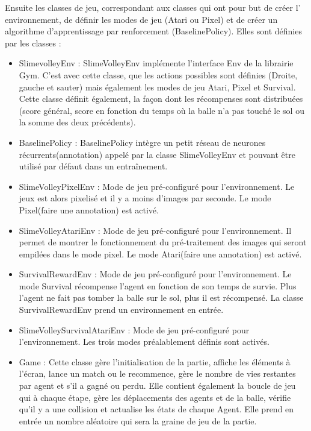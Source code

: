 \documentclass[11pt, a4paper]{article}
\begin{document}
Ensuite les classes de jeu, correspondant aux classes qui ont pour but de créer l' environnement, de définir les modes de jeu (Atari ou Pixel) et de créer un algorithme d'apprentissage par renforcement (BaselinePolicy). Elles sont définies par les classes : \\
\begin{itemize}
 \item SlimevolleyEnv : SlimeVolleyEnv implémente l'interface Env de la librairie Gym. C'est avec cette classe, que les actions possibles sont définies (Droite, gauche et sauter) mais également les modes de jeu Atari, Pixel et Survival. Cette classe définit également, la façon dont les récompenses sont distribuées (score général, score en fonction du temps où la balle n'a pas touché le sol ou la somme des deux précédents).\\

 \item BaselinePolicy : BaselinePolicy intègre un petit réseau de neurones récurrents(annotation) appelé par la classe SlimeVolleyEnv et pouvant être utilisé par défaut dans un entraînement.\\

 \item SlimeVolleyPixelEnv : Mode de jeu pré-configuré pour l'environnement. Le jeux est alors pixelisé et il y a moins d'images par seconde. Le mode Pixel(faire une annotation) est activé. \\
 
 \item SlimeVolleyAtariEnv : Mode de jeu pré-configuré pour l'environnement. Il permet de montrer le fonctionnement du pré-traitement des images qui seront empilées dans le mode pixel. Le mode Atari(faire une annotation) est activé. \\ 

\item SurvivalRewardEnv : Mode de jeu pré-configuré pour l'environnement. Le mode Survival récompense l'agent en fonction de son temps de survie. Plus l'agent ne fait pas tomber la balle sur le sol, plus il est récompensé. La classe SurvivalRewardEnv prend un environnement en entrée.
 \item  SlimeVolleySurvivalAtariEnv : Mode de jeu pré-configuré pour l'environnement. Les trois modes préalablement définis sont activés. \\

 \item Game : Cette classe gère l'initialisation de la partie, affiche les éléments à l'écran, lance un match ou le recommence, gère le nombre de vies restantes par agent et s'il a gagné ou perdu. Elle contient également la boucle de jeu qui à chaque étape, gère les déplacements des agents et de la balle, vérifie qu'il y a une collision et actualise les états de chaque Agent. Elle prend en entrée un nombre aléatoire qui sera la graine de jeu de la partie. 

\end{itemize}
\end{document}
